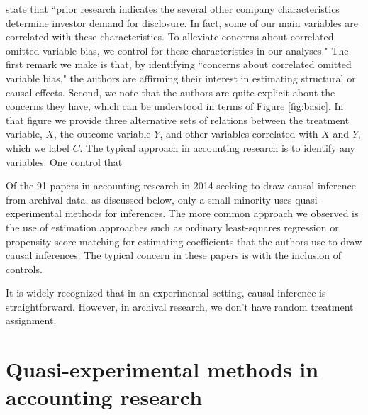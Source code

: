 \documentclass[11pt]{amsart}
\begin{document}
\cite{Hollander:2010jg} state that ``prior research indicates the several other company characteristics determine investor demand for disclosure. In fact, some of our main variables are correlated with these characteristics.
To alleviate concerns about correlated omitted variable bias, we control for these characteristics in our analyses."
The first remark we make is that, by identifying ``concerns about correlated omitted variable bias," the authors are affirming their interest in estimating structural or causal effects.
Second, we note that the authors are quite explicit about the concerns they have, which can be understood in terms of Figure \ref{fig:basic}.
In that figure we provide three alternative sets of relations between the treatment variable, $X$, the outcome variable $Y$, and other variables correlated with $X$ and $Y$, which we label $C$.
The typical approach in accounting research is to identify any variables.
One control that 


Of the 91 papers in accounting research in 2014 seeking to draw causal inference from archival data, as discussed below, only a small minority uses quasi-experimental methods for inferences.
The more common approach we observed is the use of estimation approaches such as ordinary least-squares regression or propensity-score matching for estimating coefficients that the authors use to draw causal inferences.
The typical concern in these papers is with the inclusion of controls.

It is widely recognized that in an experimental setting, causal inference is straightforward.
However, in archival research, we don't have random treatment assignment.




%





\section{Quasi-experimental methods in accounting research}
\end{document}
